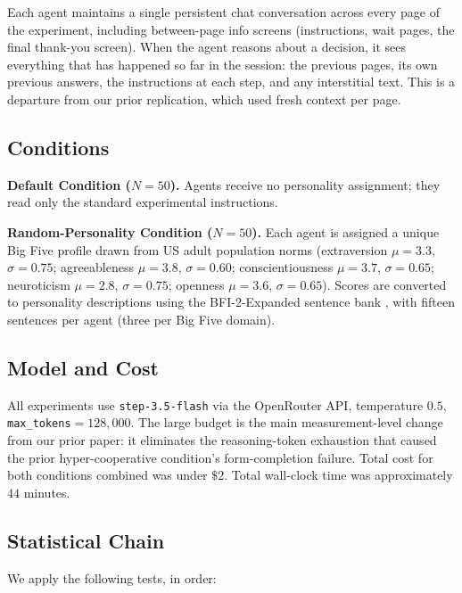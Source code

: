 \documentclass[12pt, a4paper]{article}
\begin{document}
Each agent maintains a single persistent chat conversation across every page of the experiment, including between-page info screens (instructions, wait pages, the final thank-you screen). When the agent reasons about a decision, it sees everything that has happened so far in the session: the previous pages, its own previous answers, the instructions at each step, and any interstitial text. This is a departure from our prior replication, which used fresh context per page.

\subsection{Conditions}

\textbf{Default Condition ($N=50$).} Agents receive no personality assignment; they read only the standard experimental instructions.

\textbf{Random-Personality Condition ($N=50$).} Each agent is assigned a unique Big Five profile drawn from US adult population norms (extraversion $\mu=3.3$, $\sigma=0.75$; agreeableness $\mu=3.8$, $\sigma=0.60$; conscientiousness $\mu=3.7$, $\sigma=0.65$; neuroticism $\mu=2.8$, $\sigma=0.75$; openness $\mu=3.6$, $\sigma=0.65$). Scores are converted to personality descriptions using the BFI-2-Expanded sentence bank \citep{soto2017bfi2}, with fifteen sentences per agent (three per Big Five domain).

\subsection{Model and Cost}

All experiments use \texttt{step-3.5-flash} via the OpenRouter API, temperature $0.5$, \texttt{max\_tokens}$=128{,}000$. The large budget is the main measurement-level change from our prior paper: it eliminates the reasoning-token exhaustion that caused the prior hyper-cooperative condition's form-completion failure. Total cost for both conditions combined was under $\$2$. Total wall-clock time was approximately $44$ minutes.

\subsection{Statistical Chain}

We apply the following tests, in order:
\end{document}
